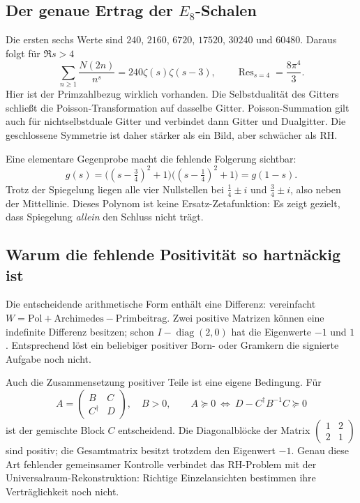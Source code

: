 \subsection{Der genaue Ertrag der $E_8$-Schalen}
Die ersten sechs Werte sind $240$, $2160$, $6720$, $17520$, $30240$ und $60480$. Daraus folgt für $\Re s>4$
\begin{equation}
 \sum_{n\geq1}\frac{N(2n)}{n^s}=240\zeta(s)\zeta(s-3),
 \qquad\mathop{\mathrm{Res}}_{s=4}=\frac{8\pi^4}{3}.
\end{equation}
Hier ist der Primzahlbezug wirklich vorhanden. Die Selbstdualität des Gitters schließt die Poisson-Transformation auf dasselbe Gitter. Poisson-Summation gilt auch für nichtselbstduale Gitter und verbindet dann Gitter und Dualgitter. Die geschlossene Symmetrie ist daher stärker als ein Bild, aber schwächer als RH. 

Eine elementare Gegenprobe macht die fehlende Folgerung sichtbar:
\begin{equation}
 g(s)=\bigl((s-\tfrac34)^2+1\bigr)\bigl((s-\tfrac14)^2+1\bigr)
 =g(1-s).
\end{equation}
Trotz der Spiegelung liegen alle vier Nullstellen bei $\tfrac14\pm i$ und $\tfrac34\pm i$, also neben der Mittellinie. Dieses Polynom ist keine Ersatz-Zetafunktion: Es zeigt gezielt, dass Spiegelung \emph{allein} den Schluss nicht trägt.

\subsection{Warum die fehlende Positivität so hartnäckig ist}
Die entscheidende arithmetische Form enthält eine Differenz: vereinfacht $W=\text{Pol}+\text{Archimedes}-\text{Primbeitrag}$. Zwei positive Matrizen können eine indefinite Differenz besitzen; schon $I-\operatorname{diag}(2,0)$ hat die Eigenwerte $-1$ und $1$. Entsprechend löst ein beliebiger positiver Born- oder Gramkern die signierte Aufgabe noch nicht.

Auch die Zusammensetzung positiver Teile ist eine eigene Bedingung. Für
\[
 A=\begin{pmatrix}B&C\\C^\dagger&D\end{pmatrix},\quad B>0,
 \qquad A\succeq0\ \Longleftrightarrow\ D-C^\dagger B^{-1}C\succeq0
\]
ist der gemischte Block $C$ entscheidend. Die Diagonalblöcke der Matrix $\left(\begin{smallmatrix}1&2\\2&1\end{smallmatrix}\right)$ sind positiv; die Gesamtmatrix besitzt trotzdem den Eigenwert $-1$. Genau diese Art fehlender gemeinsamer Kontrolle verbindet das RH-Problem mit der Universalraum-Rekonstruktion: Richtige Einzelansichten bestimmen ihre Verträglichkeit noch nicht. 


